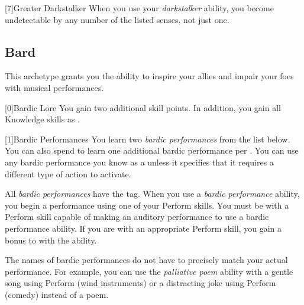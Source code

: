         [7]{Greater Darkstalker} When you use your \textit{darkstalker} ability, you become undetectable by any number of the listed senses, not just one.

    \newpage
    \subsection{Bard}
        This archetype grants you the ability to inspire your allies and impair your foes with musical performances.

        [0]{Bardic Lore} You gain two additional skill points.
        In addition, you gain all Knowledge skills as .

        [1]{Bardic Performances}
        You learn two \textit{bardic performances} from the list below.
        You can also spend  to learn one additional bardic performance per .
        You can use any bardic performance you know as a  unless it specifies that it requires a different type of action to activate.

        All \textit{bardic performances} have the  tag.
        When you use a \textit{bardic performance} ability, you begin a performance using one of your Perform skills.
        You must be  with a Perform skill capable of making an auditory performance to use a bardic performance ability.
        If you are  with an appropriate Perform skill, you gain a  bonus to  with the ability.

        The names of bardic performances do not have to precisely match your actual performance.
        For example, you can use the \textit{palliative poem} ability with a gentle song using Perform (wind instruments) or a distracting joke using Perform (comedy) instead of a poem.

